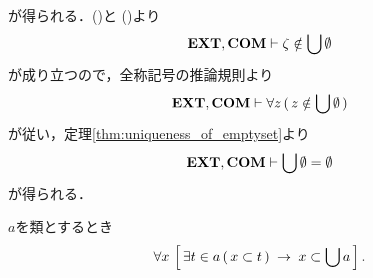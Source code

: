 \begin{sketch}
\begin{align}
			\label{fom:the_union_of_the_emptyset_is_empty_2}
		\end{align}
		が得られる．()と
		()より
		\begin{align}
			\mbox{{\bf EXT}},\mbox{\bf COM} \vdash \zeta \notin \bigcup \emptyset
		\end{align}
		が成り立つので，全称記号の推論規則より
		\begin{align}
			\mbox{{\bf EXT}},\mbox{\bf COM} \vdash \forall z\, (\, z \notin \bigcup \emptyset\, )
		\end{align}
		が従い，定理\ref{thm:uniqueness_of_emptyset}より
		\begin{align}
			\mbox{{\bf EXT}},\mbox{\bf COM} \vdash \bigcup \emptyset = \emptyset
		\end{align}
		が得られる．
		\QED
	\end{sketch}
	
	\begin{screen}
		\begin{thm}[要素の部分集合は合併の部分集合]
		\label{thm:union_is_bigger_than_any_member}
			$a$を類とするとき
			\begin{align}
				\forall x\, \left[\, \exists t \in a\, (\, x \subset t\, ) \hspace{0.25em}\rightarrow\hspace{0.25em} x \subset \bigcup a\, \right].
			\end{align}
		\end{thm}
	\end{screen}
	
